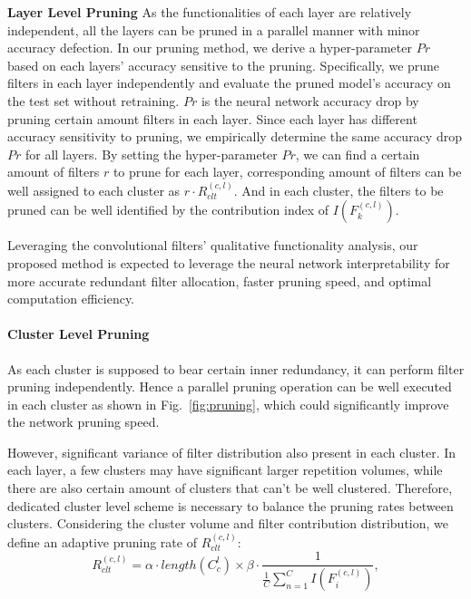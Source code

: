 \documentclass{article} %
\begin{document}
\textbf{Layer Level Pruning}%
	As the functionalities of each layer are relatively independent, all the layers can be pruned in a parallel manner with minor accuracy defection.
	In our pruning method, we derive a hyper-parameter $Pr$ based on each layers' accuracy sensitive to the pruning.
	Specifically, we prune filters in each layer independently and evaluate the pruned model's accuracy on the test set without retraining.
	$Pr$ is the neural network accuracy drop by pruning certain amount filters in each layer.
	Since each layer has different accuracy sensitivity to pruning, we empirically determine the same accuracy drop $Pr$ for all layers.
	By setting the hyper-parameter $Pr$, we can find a certain amount of filters $r$ to prune for each layer, corresponding amount of filters can be well assigned to each cluster as $r\cdot R_{clt}^{(c,l)}$.
	And in each cluster, the filters to be pruned can be well identified by the contribution index of $I(F_k^{(c,l)})$.

	Leveraging the convolutional filters' qualitative functionality analysis, our proposed method is expected to leverage the neural network interpretability for more accurate redundant filter allocation, faster pruning speed, and optimal computation efficiency.
\paragraph{Cluster Level Pruning}
As each cluster is supposed to bear certain inner redundancy, it can perform filter pruning independently.
	Hence a parallel pruning operation can be well executed in each cluster as shown in Fig.~\ref{fig:pruning}, which could significantly improve the network pruning speed.

However, significant variance of filter distribution also present in each cluster.
	In each layer, a few clusters may have significant larger repetition volumes, while there are also certain amount of clusters that can't be well clustered.
	Therefore, dedicated cluster level scheme is necessary to balance the pruning rates between clusters.
	Considering the cluster volume and filter contribution distribution, we define an adaptive pruning rate of $R_{clt}^{(c,l)}$:
\begin{equation}
	R_{clt}^{(c,l)}=\alpha\cdot length(C_c^l) \times \beta\cdot \frac{1}{\frac{1}{C}\sum_{n=1}^{C} I(F^{(c,l)}_i)},
	\label{eq:cluster}
\end{equation}
\end{document}
